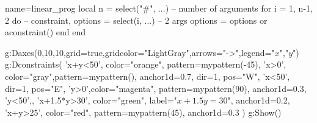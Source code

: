 \documentclass[]{standalone}
\begin{document}
\begin{luadraw}{name=linear_prog}
    local n = select("#", ...)  -- number of arguments
    for i = 1, n-1, 2 do   -- 
        constraint, options = select(i, ...)  -- 2 args
        options = options or {}
        aconstraint() 
    end
end

g:Daxes({0,10,10},{grid=true,gridcolor="LightGray",arrows="->",legend={"$x$","$y$"}})
g:Dconstraints(
    'x+y<50', {color="orange", pattern=mypattern(-45)},
    'x>0', {color="gray",pattern=mypattern(), anchor1d=0.7, dir=1, pos="W"},
    'x<50', {dir=1, pos="E"},
    'y>0',{color="magenta", pattern=mypattern(90), anchor1d=0.3},
    'y<50',{},
    'x+1.5*y>30', {color="green", label="$x+1.5y=30$", anchor1d=0.2},
    'x+y>25', {color="red", pattern=mypattern(45), anchor1d=0.3}
    )
g:Show()
\end{luadraw}
\end{document}
